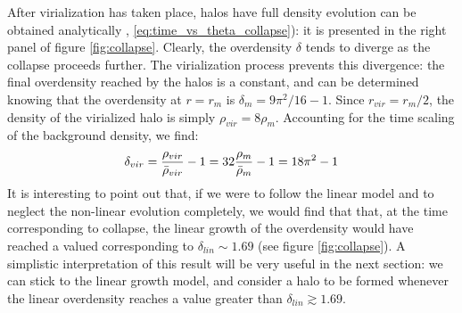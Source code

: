     
      After virialization has taken place, halos have   full density evolution can be obtained analytically , \ref{eq:time_vs_theta_collapse}): it is presented in the right panel of figure \ref{fig:collapse}. Clearly, the overdensity $\delta$ tends to diverge as the collapse proceeds further. The virialization process prevents this divergence: the final overdensity reached by the halos is a constant, and can be determined knowing that the overdensity at $r=r_m$ is $\delta_m = 9\pi^2/16-1$. Since $r_{vir} = r_m/2$, the density of the virialized halo is simply $\rho_{vir}=8\rho_m$. Accounting for the time scaling of the background density, we find:
   \begin{align}
    \delta_{vir} = \frac{\rho_{vir}}{\Bar{\rho}_{vir}}-1 = 32 \frac{
    \rho_m}{\Bar{\rho}_m}-1= 18\pi^2 -1
  \end{align}
  It is interesting to point out that, if we were to follow the linear model and to neglect the non-linear evolution completely, we would find that that, at the time corresponding to collapse, the linear growth of the overdensity would have reached a valued corresponding to $\delta_{lin}\sim 1.69$ (see figure \ref{fig:collapse}). A simplistic interpretation of this result will be very useful in the next section: we can stick to the linear growth model, and consider a halo to be formed whenever the linear overdensity reaches a value greater than $\delta_{lin}\gtrsim 1.69$.
